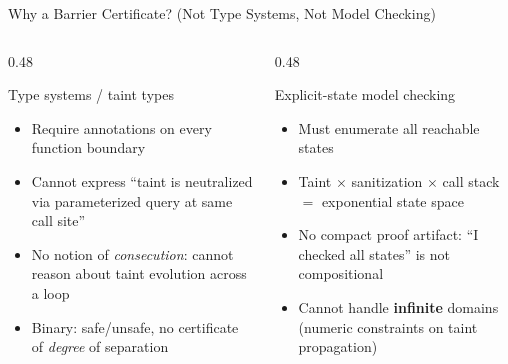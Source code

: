 \documentclass[aspectratio=169]{beamer}
\begin{document}
\begin{frame}{Why a Barrier Certificate? (Not Type Systems, Not Model Checking)}
\begin{columns}[T]
\begin{column}{0.48\textwidth}
\begin{block}{\textcolor{unsafe}{Type systems / taint types}}
\begin{itemize}
  \item Require annotations on every function boundary
  \item Cannot express ``taint is neutralized via parameterized query at same call site''
  \item No notion of \emph{consecution}: cannot reason about taint evolution across a loop
  \item Binary: safe/unsafe, no certificate of \emph{degree} of separation
\end{itemize}
\end{block}
\end{column}
\begin{column}{0.48\textwidth}
\begin{block}{\textcolor{warn}{Explicit-state model checking}}
\begin{itemize}
  \item Must enumerate all reachable states
  \item Taint $\times$ sanitization $\times$ call stack $=$ exponential state space
  \item No compact proof artifact: ``I checked all states'' is not compositional
  \item Cannot handle \textbf{infinite} domains (numeric constraints on taint propagation)
\end{itemize}
\end{block}
\end{column}
\end{columns}

\vspace{0.6em}
\begin{center}
\end{center}
\end{frame}
\end{document}
